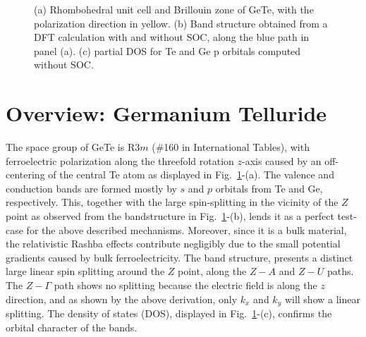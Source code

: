 \begin{figure}[h]
{}
\caption{\label{fig:Rashba_BZBSDOS}(a) Rhombohedral unit cell and Brillouin zone of GeTe, with the polarization direction in yellow. (b) Band structure obtained from a DFT calculation with and without SOC, along the blue path in panel (a). (c) partial DOS for Te and Ge p orbitals computed without SOC.}
\end{figure}
\section{Overview: Germanium Telluride}
The space group of GeTe is R$3m$ (\#160 in International Tables), with ferroelectric polarization along the threefold rotation $z$-axis caused by an off-centering of the central Te atom \cite{Rabe1987} as displayed in Fig.~\ref{fig:Rashba_BZBSDOS}-(a). The valence and conduction bands are formed mostly by $s$ and $p$ orbitals from Te and Ge, respectively.
This, together with the large spin-splitting in the vicinity of the $Z$ point \cite{DiSante2013} as observed from the bandstructure in Fig.~\ref{fig:Rashba_BZBSDOS}-(b), lends it as a perfect test-case for the above described mechanisms. Moreover, since it is a bulk material, the relativistic Rashba effects contribute negligibly due to the small potential gradients caused by bulk ferroelectricity. The band structure,  presents a distinct large linear spin splitting around the $Z$ point, along the $Z-A$ and $Z-U$ paths. The $Z-\Gamma$ path shows no splitting because the electric field is along the $z$ direction, and as shown by the above derivation, only $k_x$ and $k_y$ will show a linear splitting.
The density of states (DOS), displayed in Fig.~\ref{fig:Rashba_BZBSDOS}-(c), confirms the orbital character of the bands.
